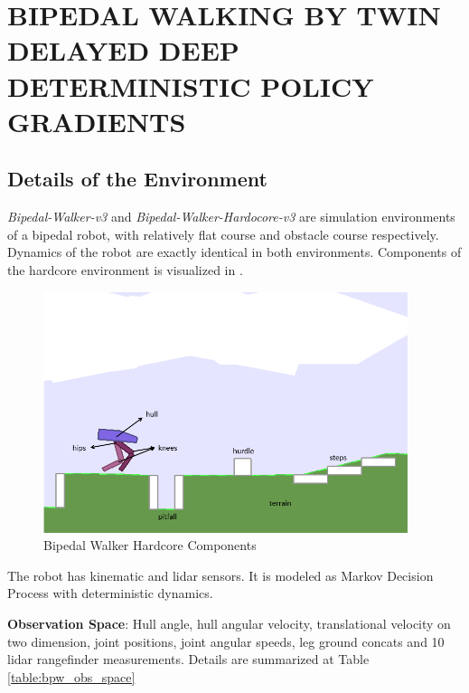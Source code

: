 \chapter{BIPEDAL WALKING BY TWIN DELAYED DEEP DETERMINISTIC POLICY GRADIENTS}
\label{chap:exp_setup}

\section{Details of the Environment}

\textit{Bipedal-Walker-v3} and \textit{Bipedal-Walker-Hardocore-v3} are simulation environments of a bipedal robot, with relatively flat course and obstacle course respectively. Dynamics of the robot are exactly identical in both environments. Components of the hardcore environment is visualized in .

\begin{figure}
	\centering
	\includegraphics[width=0.95\textwidth]{figures/bipedal/bpedal_annotated.png}
	\caption{Bipedal Walker Hardcore Components}
	\label{fig:bipedal_hardcore_components}
\end{figure}

The robot has kinematic and lidar sensors. It is modeled as Markov Decision Process with deterministic dynamics. 

\textbf{Observation Space}: Hull angle, hull angular velocity, translational velocity on two dimension, joint positions, joint angular speeds, leg ground concats and 10 lidar rangefinder measurements. Details are summarized at Table \ref{table:bpw_obs_space}

